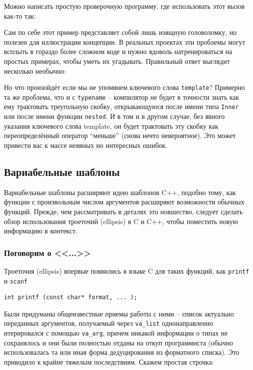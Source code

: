 \documentclass[a4paper,12pt,oneside]{article}
\renewcommand{\texttt}[2][black]{\textcolor{#1}{\ttfamily #2}}
\begin{document}
Можно написать простую проверочную программу, где использовать этот вызов как-то так:



Сам по себе этот пример представляет собой лишь изящную головоломку, но полезен для иллюстрации концепции. В реальных проектах эти проблемы могут всплыть в гораздо более сложном коде и нужно вдоволь натренироваться на простых примерах, чтобы уметь их угадывать. Правильный ответ выглядит несколько необычно:



Но что произойдёт если мы не упомянем ключевого слова \lstinline!template!? Примерно та же проблема, что и с \lstinline!typename! -- компилятор не будет в точности знать как ему трактовать треугольную скобку, открывающуюся после имени типа \lstinline!Inner! или после имени функции \lstinline!nested!. И в том и в другом случае, без явного указания ключевого слова template, он будет трактовать эту скобку как переопределённый оператор ``меньше'' (снова нечто невероятное). Это может привести вас к массе неявных но интересных ошибок.

\pagebreak
\subsection{Вариабельные шаблоны}\label{VariadicTemplates}

Вариабельные шаблоны расширяют идею шаблонов C++, подобно тому, как функции с произвольным числом аргументов расширяют возможности обычных функций. Прежде, чем рассматривать в деталях это новшество, следует сделать обзор использования троеточий (ellipsis) в C и C++, чтобы поместить новую информацию в контекст.

\subsubsection{Поговорим о <<\texttt{...}>>}

Троеточия (ellipsis) впервые появились в языке C для таких функций, как \lstinline!printf! и \lstinline!scanf! 

\begin{lstlisting}
int printf (const char* format, ... );
\end{lstlisting}

Были придуманы общеизвестные приемы работы с ними -- список актуально переданных аргументов, получаемый через \lstinline!va_list! однонаправленно итерировался с помощью \lstinline!va_arg!, причем никакой информации о типах не сохранялось и они были полностью отданы на откуп программиста (обычно использовалась та или иная форма дедуцирования из форматного списка). Это приводило к крайне тяжелым последствиям. Скажем простая строчка:
\end{document}
